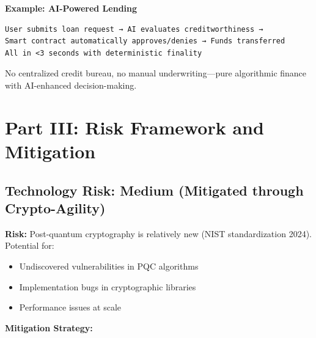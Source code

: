 \documentclass[11pt,a4paper]{article}
\begin{document}
\textbf{Example: AI-Powered Lending}

\begin{verbatim}
User submits loan request → AI evaluates creditworthiness →
Smart contract automatically approves/denies → Funds transferred
All in <3 seconds with deterministic finality
\end{verbatim}

No centralized credit bureau, no manual underwriting—pure algorithmic finance with AI-enhanced decision-making.

\newpage
\section{Part III: Risk Framework and Mitigation}

\subsection{Technology Risk: Medium (Mitigated through Crypto-Agility)}

\textbf{Risk:} Post-quantum cryptography is relatively new (NIST standardization 2024). Potential for:
\begin{itemize}[leftmargin=*]
\item Undiscovered vulnerabilities in PQC algorithms
\item Implementation bugs in cryptographic libraries
\item Performance issues at scale
\end{itemize}

\textbf{Mitigation Strategy:}
\end{document}
